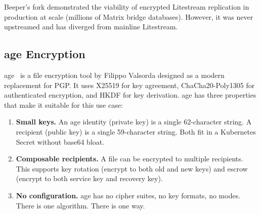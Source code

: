 Beeper's fork demonstrated the viability of encrypted Litestream replication
in production at scale (millions of Matrix bridge databases). However, it
was never upstreamed and has diverged from mainline Litestream.

\subsection{age Encryption}

age~\cite{age} is a file encryption tool by Filippo Valsorda designed as a
modern replacement for PGP. It uses X25519 for key agreement, ChaCha20-Poly1305
for authenticated encryption, and HKDF for key derivation. age has three
properties that make it suitable for this use case:

\begin{enumerate}[nosep]
    \item \textbf{Small keys.} An age identity (private key) is a single
    62-character string. A recipient (public key) is a single 59-character
    string. Both fit in a Kubernetes Secret without base64 bloat.

    \item \textbf{Composable recipients.} A file can be encrypted to multiple
    recipients. This supports key rotation (encrypt to both old and new keys)
    and escrow (encrypt to both service key and recovery key).

    \item \textbf{No configuration.} age has no cipher suites, no key
    formats, no modes. There is one algorithm. There is one way.
\end{enumerate}

